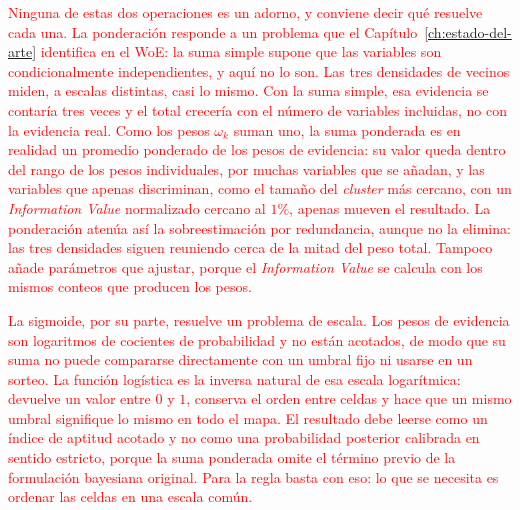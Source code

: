 
\textcolor{red}{Ninguna de estas dos operaciones es un adorno, y conviene decir qué
resuelve cada una. La ponderación responde a un problema que el
Capítulo~\ref{ch:estado-del-arte} identifica en el WoE: la suma simple supone
que las variables son condicionalmente independientes, y aquí no lo son. Las
tres densidades de vecinos miden, a escalas distintas, casi lo mismo. Con la
suma simple, esa evidencia se contaría tres veces y el total crecería con el
número de variables incluidas, no con la evidencia real. Como los pesos
$\omega_k$ suman uno, la suma ponderada es en realidad un promedio ponderado de
los pesos de evidencia: su valor queda dentro del rango de los pesos
individuales, por muchas variables que se añadan, y las variables que apenas
discriminan, como el tamaño del \textit{cluster} más cercano, con un
\textit{Information Value} normalizado cercano al $1\%$, apenas mueven el
resultado. La ponderación atenúa así la sobreestimación por redundancia,
aunque no la elimina: las tres densidades siguen reuniendo cerca de la mitad
del peso total. Tampoco añade parámetros que ajustar, porque el
\textit{Information Value} se calcula con los mismos conteos que producen los
pesos.}

\textcolor{red}{La sigmoide, por su parte, resuelve un problema de escala. Los
pesos de evidencia son logaritmos de cocientes de probabilidad y no están
acotados, de modo que su suma no puede compararse directamente con un umbral
fijo ni usarse en un sorteo. La función logística es la inversa natural de esa
escala logarítmica: devuelve un valor entre $0$ y $1$, conserva el orden entre
celdas y hace que un mismo umbral signifique lo mismo en todo el mapa. El
resultado debe leerse como un índice de aptitud acotado y no como una
probabilidad posterior calibrada en sentido estricto, porque la suma ponderada
omite el término previo de la formulación bayesiana original. Para la regla
basta con eso: lo que se necesita es ordenar las celdas en una escala común.}


